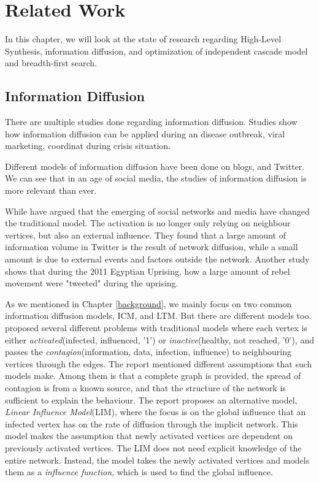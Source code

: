 \chapter{Related Work}  \label{relatedWork}


In this chapter, we will look at the state of research regarding High-Level Synthesis, information diffusion, and optimization of independent cascade model and breadth-first search.

\section{Information Diffusion} 
There are multiple studies done regarding information diffusion. Studies show how information diffusion can be applied during an disease outbreak\cite{InformationDiffusionThroughBlogspace}, viral marketing\cite{ViralMarketing}, coordinat during crisis situation\cite{Starbird:2012:RRI:2145204.2145212}. 

Different models of information diffusion have been done on blogs\citep{Adar:2005:TIE:1092358.1092473}\cite{GomezRodriguez:2010:IND:1835804.1835933}, and Twitter\cite{Bakshy:2011:EIQ:1935826.1935845}. We can see that in an age of social media, the studies of information diffusion is more relevant than ever. 

While \cite{InfoDiffAndExternalInfluInNetworks} have argued that the emerging of social networks and media have changed the traditional model. The activation is no longer only relying on neighbour vertices, but also an external influence. They found that a large amount of information volume in Twitter is the result of network diffusion, while a small amount is due to external events and factors outside the network\citep{InfoDiffAndExternalInfluInNetworks}. Another study shows that during the 2011 Egyptian Uprising, how a large amount of rebel movement were "tweeted"\cite{Starbird:2012:RRI:2145204.2145212} during the uprising.

As we mentioned in Chapter \ref{background}, we mainly focus on two common information diffusion models, ICM, and LTM. But there are different models too. \cite{5694014} proposed several different problems with traditional models where each vertex is either \textit{activated}(infected, influenced, '1') or \textit{inactive}(healthy, not reached, '0'), and passes the \textit{contagion}(information, data, infection, influence) to neighbouring vertices through the edges. The report mentioned different assumptions that such models make. Among them is that a complete graph is provided, the spread of contagion is from a known source, and that the structure of the network is sufficient to explain the behaviour\citep{5694014}. The report proposes an alternative model, \textit{Linear Influence Model}(LIM), where the focus is on the global influence that an infected vertex has on the rate of diffusion through the implicit network. This model makes the assumption that newly activated vertices are dependent on previously activated vertices. The LIM does not need explicit knowledge of the entire network. Instead, the model takes the newly activated vertices and models them as a \textit{influence function}, which is used to find the global influence.     

